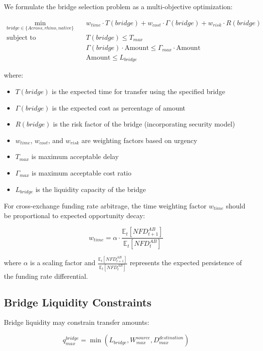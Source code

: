 \documentclass{article}
\begin{document}
We formulate the bridge selection problem as a multi-objective optimization:

\begin{align}
\min_{bridge \in \{Across, rhino, native\}} \quad & w_{time} \cdot T(bridge) + w_{cost} \cdot \Gamma(bridge) + w_{risk} \cdot R(bridge) \\
\text{subject to} \quad & T(bridge) \leq T_{max} \\
& \Gamma(bridge) \cdot \text{Amount} \leq \Gamma_{max} \cdot \text{Amount} \\
& \text{Amount} \leq L_{bridge}
\end{align}

where:
\begin{itemize}
    \item $T(bridge)$ is the expected time for transfer using the specified bridge
    \item $\Gamma(bridge)$ is the expected cost as percentage of amount
    \item $R(bridge)$ is the risk factor of the bridge (incorporating security model)
    \item $w_{time}$, $w_{cost}$, and $w_{risk}$ are weighting factors based on urgency
    \item $T_{max}$ is maximum acceptable delay
    \item $\Gamma_{max}$ is maximum acceptable cost ratio
    \item $L_{bridge}$ is the liquidity capacity of the bridge
\end{itemize}

For cross-exchange funding rate arbitrage, the time weighting factor $w_{time}$ should be proportional to expected opportunity decay:

\begin{equation}
w_{time} = \alpha \cdot \frac{\mathbb{E}_t[NFD^{AB}_{t+1}]}{\mathbb{E}_t[NFD^{AB}_{t}]}
\end{equation}

where $\alpha$ is a scaling factor and $\frac{\mathbb{E}_t[NFD^{AB}_{t+1}]}{\mathbb{E}_t[NFD^{AB}_{t}]}$ represents the expected persistence of the funding rate differential.

\subsection{Bridge Liquidity Constraints}

Bridge liquidity may constrain transfer amounts:

\begin{equation}
q_{max}^{bridge} = \min(L_{bridge}, W_{max}^{source}, D_{max}^{destination})
\end{equation}
\end{document}
